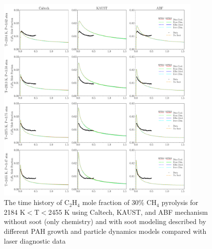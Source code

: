 \begin{figure}[H]
	\centering
	\includegraphics[width=0.9\textwidth]{Figures/Results/Shocktube/Stanford/june/30CH4_C2H4_mechs_s1.pdf}
	\caption{The time history of $\mathrm{C_2H_4}$ mole fraction of 30\% $\mathrm{CH_4}$ pyrolysis for 2184 K$<\mathrm{T}<$2455 K using Caltech, KAUST, and ABF mechanism without soot (only chemistry) and with soot modeling described by different PAH growth and particle dynamics models compared with laser diagnostic data}
	\label{fig:shocktubest_30ch4_c2h4_1} 
\end{figure}


